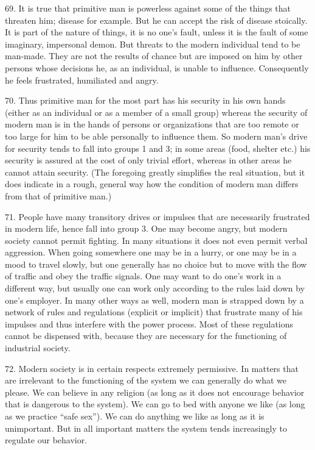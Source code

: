 \documentclass{article}
\begin{document}
69. It is true that primitive man is powerless against some of the things that threaten him; disease 
for example. But he can accept the risk of disease stoically. It is part of the nature of things, it is 
no one’s fault, unless it is the fault of some imaginary, impersonal demon. But threats to the 
modern individual tend to be man-made. They are not the results of chance but are imposed on 
him by other persons whose decisions he, as an individual, is unable to influence. Consequently 
he feels frustrated, humiliated and angry. \vspace{\baselineskip}

70. Thus primitive man for the most part has his security in his own hands (either as an individual 
or as a member of a small group) whereas the security of modern man is in the hands of persons 
or organizations that are too remote or too large for him to be able personally to influence them. So 
modern man’s drive for security tends to fall into groups 1 and 3; in some areas (food, shelter etc.) 
his security is assured at the cost of only trivial effort, whereas in other areas he cannot attain 
security. (The foregoing greatly simplifies the real situation, but it does indicate in a rough, general 
way how the condition of modern man differs from that of primitive man.) \vspace{\baselineskip}

71. People have many transitory drives or impulses that are necessarily frustrated in modern life, 
hence fall into group 3. One may become angry, but modern society cannot permit fighting. In 
many situations it does not even permit verbal aggression. When going somewhere one may be in 
a hurry, or one may be in a mood to travel slowly, but one generally has no choice but to move 
with the flow of traffic and obey the traffic signals. One may want to do one’s work in a different 
way, but usually one can work only according to the rules laid down by one’s employer. In many 
other ways as well, modern man is strapped down by a network of rules and regulations (explicit 
or implicit) that frustrate many of his impulses and thus interfere with the power process. Most of 
these regulations cannot be dispensed with, because they are necessary for the functioning of 
industrial society. \vspace{\baselineskip}

72. Modern society is in certain respects extremely permissive. In matters that are irrelevant to 
the functioning of the system we can generally do what we please. We can believe in any religion 
(as long as it does not encourage behavior that is dangerous to the system). We can go to bed with 
anyone we like (as long as we practice “safe sex”). We can do anything we like as long as it is 
unimportant. But in all important matters the system tends increasingly to regulate our behavior. \vspace{\baselineskip}
\end{document}
